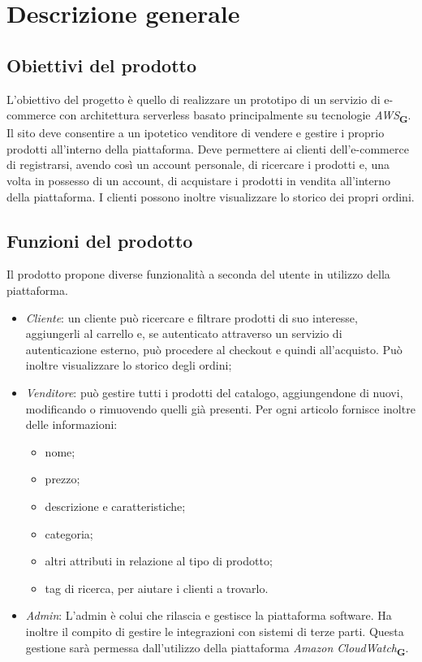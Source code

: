 \section{Descrizione generale}
\subsection{Obiettivi del prodotto}
L'obiettivo del progetto è quello di realizzare un prototipo di un servizio di e-commerce con architettura serverless basato principalmente su tecnologie \textit{AWS}\textsubscript{\textbf{G}}. Il sito deve consentire a un ipotetico venditore di vendere e gestire i proprio prodotti all'interno della piattaforma. Deve permettere ai clienti dell'e-commerce di registrarsi, avendo così un account personale, di ricercare i prodotti e, una volta in possesso di un account, di acquistare i prodotti in vendita all'interno della piattaforma. I clienti possono inoltre visualizzare lo storico dei propri ordini.
\subsection{Funzioni del prodotto}
Il prodotto propone diverse funzionalità a seconda del utente in utilizzo della piattaforma.
\begin{itemize}
    \item \textit{Cliente}: un cliente può ricercare e filtrare prodotti di suo interesse, aggiungerli al carrello e, se autenticato attraverso un servizio di autenticazione esterno, può procedere al checkout e quindi all'acquisto. Può inoltre visualizzare lo storico degli ordini;
    \item \textit{Venditore}: può gestire tutti i prodotti del catalogo, aggiungendone di nuovi, modificando o rimuovendo quelli già presenti. Per ogni articolo fornisce inoltre delle  informazioni:
          \begin{itemize}
              \item nome;
              \item prezzo;
              \item descrizione e caratteristiche;
              \item categoria;
              \item altri attributi in relazione al tipo di prodotto;
              \item tag di ricerca, per aiutare i clienti a trovarlo.
          \end{itemize}
    \item \textit{Admin}: L'admin è colui che rilascia e gestisce la piattaforma software. Ha inoltre il compito di gestire le integrazioni con sistemi di terze parti. Questa gestione sarà permessa dall'utilizzo della piattaforma \textit{Amazon CloudWatch}\textsubscript{\textbf{G}}.
\end{itemize}
